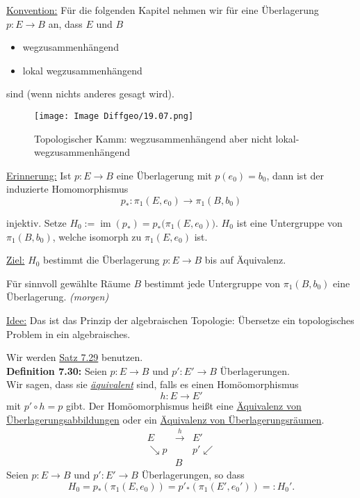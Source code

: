 \documentclass[fleqn, 12pt, letterpaper]{article}
\begin{document}
\vspace{0.5em}
\underline{Konvention:} Für die folgenden Kapitel nehmen wir für eine Überlagerung \( p : E \to B \) an, dass \( E \) und \( B \) 
\begin{itemize}
    \item wegzusammenhängend
    \item lokal wegzusammenhängend
\end{itemize}
sind (wenn nichts anderes gesagt wird).\\
  \begin{figure}[H]
    \centering
    \texttt{[image: Image Diffgeo/19.07.png]}
	\caption{Topologischer Kamm: wegzusammenhängend aber nicht lokal-wegzusammenhängend}
 \end{figure}

\underline{Erinnerung:} Ist \( p : E \to B \) eine Überlagerung mit \( p(e_0) = b_0 \), dann ist der induzierte Homomorphismus
\[
p_* : \pi_1(E, e_0) \to \pi_1(B, b_0)
\]

injektiv. Setze \( H_0 := \operatorname{im}(p_*) = p_*\big( \pi_1(E, e_0) \big) \). \( H_0 \) ist eine Untergruppe von \( \pi_1(B, b_0) \), welche isomorph zu \( \pi_1(E, e_0) \) ist.

\vspace{1em}
\underline{Ziel:} \( H_0 \) bestimmt die Überlagerung \( p : E \to B \) bis auf Äquivalenz.

\vspace{0.5em}
Für sinnvoll gewählte Räume \( B \) bestimmt jede Untergruppe von \( \pi_1(B, b_0) \) eine Überlagerung. \emph{(morgen)}

\vspace{1em}
\underline{Idee:} Das ist das Prinzip der algebraischen Topologie: Übersetze ein topologisches Problem in ein algebraisches.

\vspace{1em}
Wir werden \underline{Satz 7.29} benutzen.\\

\textbf{Definition 7.30:} 
Seien \( p : E \to B \) und \( p' : E' \to B \) Überlagerungen. \\
Wir sagen, dass sie \emph{\underline{äquivalent}} sind, falls es einen Homöomorphismus 
\[
h : E \to E'
\]
mit \( p' \circ h = p \) gibt. Der Homöomorphismus heißt eine \underline{Äquivalenz von Überlagerungsabbildungen} oder ein \underline{Äquivalenz von Überlagerungsräumen}.
\[
\begin{array}{ccc}
E & \xrightarrow{h} & E' \\
\searrow p & & p' \swarrow \\
& B &
\end{array}
\]
\vspace{1em}
Seien \( p : E \to B \) und \( p' : E' \to B \) Überlagerungen, so dass
\[
H_0 = p_* \left( \pi_1(E, e_0) \right) = p'_* \left( \pi_1(E', e_0') \right) =: H_0' .
\]
\end{document}
